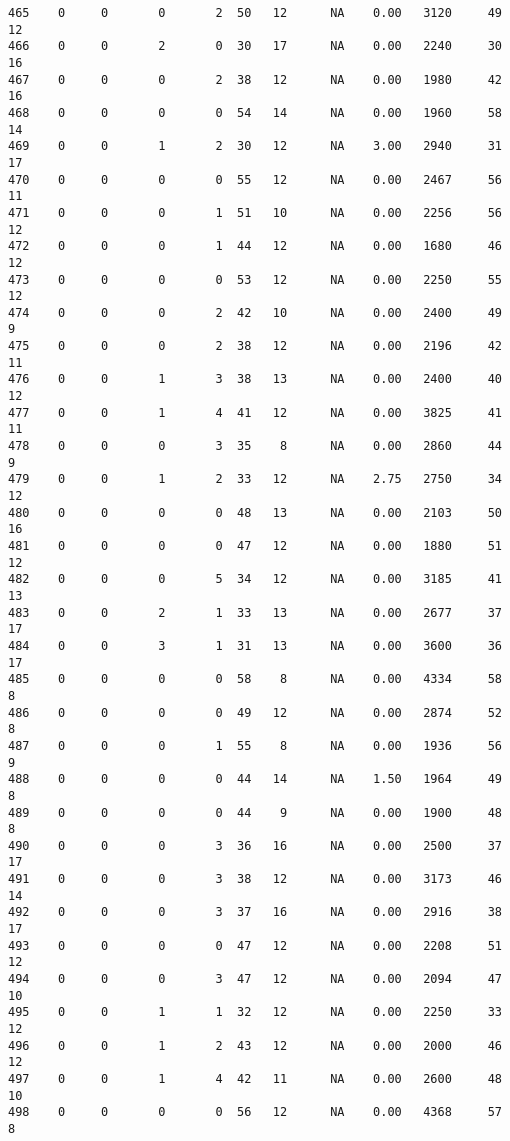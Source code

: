 \documentclass[
  letterpaper,
  DIV=11,
  numbers=noendperiod]{scrreprt}
\begin{document}
\begin{verbatim}
465    0     0       0       2  50   12      NA    0.00   3120     49      12
466    0     0       2       0  30   17      NA    0.00   2240     30      16
467    0     0       0       2  38   12      NA    0.00   1980     42      16
468    0     0       0       0  54   14      NA    0.00   1960     58      14
469    0     0       1       2  30   12      NA    3.00   2940     31      17
470    0     0       0       0  55   12      NA    0.00   2467     56      11
471    0     0       0       1  51   10      NA    0.00   2256     56      12
472    0     0       0       1  44   12      NA    0.00   1680     46      12
473    0     0       0       0  53   12      NA    0.00   2250     55      12
474    0     0       0       2  42   10      NA    0.00   2400     49       9
475    0     0       0       2  38   12      NA    0.00   2196     42      11
476    0     0       1       3  38   13      NA    0.00   2400     40      12
477    0     0       1       4  41   12      NA    0.00   3825     41      11
478    0     0       0       3  35    8      NA    0.00   2860     44       9
479    0     0       1       2  33   12      NA    2.75   2750     34      12
480    0     0       0       0  48   13      NA    0.00   2103     50      16
481    0     0       0       0  47   12      NA    0.00   1880     51      12
482    0     0       0       5  34   12      NA    0.00   3185     41      13
483    0     0       2       1  33   13      NA    0.00   2677     37      17
484    0     0       3       1  31   13      NA    0.00   3600     36      17
485    0     0       0       0  58    8      NA    0.00   4334     58       8
486    0     0       0       0  49   12      NA    0.00   2874     52       8
487    0     0       0       1  55    8      NA    0.00   1936     56       9
488    0     0       0       0  44   14      NA    1.50   1964     49       8
489    0     0       0       0  44    9      NA    0.00   1900     48       8
490    0     0       0       3  36   16      NA    0.00   2500     37      17
491    0     0       0       3  38   12      NA    0.00   3173     46      14
492    0     0       0       3  37   16      NA    0.00   2916     38      17
493    0     0       0       0  47   12      NA    0.00   2208     51      12
494    0     0       0       3  47   12      NA    0.00   2094     47      10
495    0     0       1       1  32   12      NA    0.00   2250     33      12
496    0     0       1       2  43   12      NA    0.00   2000     46      12
497    0     0       1       4  42   11      NA    0.00   2600     48      10
498    0     0       0       0  56   12      NA    0.00   4368     57       8

\end{verbatim}
\end{document}
